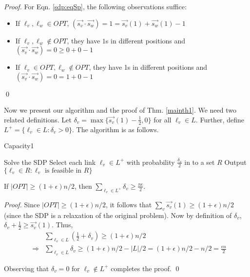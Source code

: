 \documentclass[11pt]{amsart}
\begin{document}
\begin{proof}
For Eqn. \ref{sdp:eqSp}, the following observations suffice:
\begin{itemize}
\item If $\ell_v, \ell_w \in OPT$, $(\vec{s_v} \cdot \vec{s_w}) = 1 = \vec{s_v}(1) + \vec{s_w}(1) - 1$  
\item If $\ell_v, \ell_w \not \in OPT$, they have $1$s in different positions and $(\vec{s_v} \cdot \vec{s_w}) = 0 \geq 0 +0 - 1$  
\item If $\ell_v \in OPT, \ell_w \not \in OPT$, they have 1s in different positions and $(\vec{s_v} \cdot \vec{s_w}) = 0 = 1 +0 - 1$  
\end{itemize}
\qed
\end{proof}



Now we present our algorithm and the proof of Thm. \ref{mainth1}. We need two related definitions.
Let $\delta_v = \max\{\vec{s_v}(1) - \frac{1}{2}, 0\}$ for all $\ell_v \in L$. Further, define $L^+ = \{\ell_v \in L: \delta_v > 0\}$. The algorithm is as follows.


\begin{algorithm}                      \caption{Capacity1}          \label{alg1}                           \begin{algorithmic}[1]                    \STATE Solve the SDP
     \STATE Select each link $\ell_v \in L^+$ with probability $\frac{\delta_v}{2}$ in to a set $R$ 
     \STATE Output $\{\ell_v \in R : \ell_v \text{ is feasible in } R\}$
\end{algorithmic}
\end{algorithm}

\begin{lemma}
\label{sumdelta}
If $|OPT| \geq (1 + \epsilon) n/2$, then
$\sum_{\ell_v \in L^+} \delta_v \geq \frac{n \epsilon}{2}$.
\label{lemma1}
\end{lemma}
\begin{proof}
Since $|OPT| \geq (1 + \epsilon) n/2$, it follows that $\sum_v \vec{s_v}(1) \geq (1 + \epsilon) n/2$ (since the SDP is a 
relaxation of the original problem). Now by definition of $\delta_v$, $\delta_v + \frac{1}{2} \geq \vec{s_v}(1)$.
Thus, 
\begin{eqnarray*}
& & \sum_{\ell_v \in L} \left(\frac{1}{2} + \delta_v\right) \geq (1 + \epsilon) n/2 \\
& \Rightarrow & \sum_{\ell_v \in L}  \delta_v \geq (1 + \epsilon) n/2 - |L|/2 = (1 + \epsilon) n/2 - n/2 = \frac{\epsilon n}{2}
\end{eqnarray*}

Observing that $\delta_v = 0$ for $\ell_v \not \in L^+$ completes the proof. \qed
\end{proof}
\end{document}
